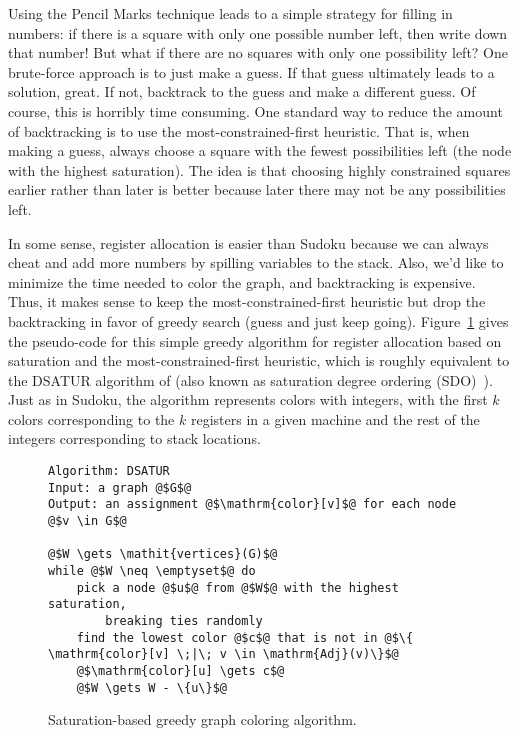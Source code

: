 \documentclass[12pt]{book}
\begin{document}
Using the Pencil Marks technique leads to a simple strategy for
filling in numbers: if there is a square with only one possible number
left, then write down that number! But what if there are no squares
with only one possibility left? One brute-force approach is to just
make a guess. If that guess ultimately leads to a solution, great.  If
not, backtrack to the guess and make a different guess.  Of course,
this is horribly time consuming. One standard way to reduce the amount
of backtracking is to use the most-constrained-first heuristic. That
is, when making a guess, always choose a square with the fewest
possibilities left (the node with the highest saturation).  The idea
is that choosing highly constrained squares earlier rather than later
is better because later there may not be any possibilities left.

In some sense, register allocation is easier than Sudoku because we
can always cheat and add more numbers by spilling variables to the
stack. Also, we'd like to minimize the time needed to color the graph,
and backtracking is expensive. Thus, it makes sense to keep the
most-constrained-first heuristic but drop the backtracking in favor of
greedy search (guess and just keep going).
Figure~\ref{fig:satur-algo} gives the pseudo-code for this simple
greedy algorithm for register allocation based on saturation and the
most-constrained-first heuristic, which is roughly equivalent to the
DSATUR algorithm of \cite{Brelaz:1979eu} (also known as
saturation degree ordering
(SDO)~\citep{Gebremedhin:1999fk,Omari:2006uq}).  Just as in Sudoku,
the algorithm represents colors with integers, with the first $k$
colors corresponding to the $k$ registers in a given machine and the
rest of the integers corresponding to stack locations.

\begin{figure}[btp]
  \centering
\begin{lstlisting}[basicstyle=\rmfamily,deletekeywords={for,from,with,is,not,in,find},morekeywords={while},columns=fullflexible]
Algorithm: DSATUR
Input: a graph @$G$@
Output: an assignment @$\mathrm{color}[v]$@ for each node @$v \in G$@

@$W \gets \mathit{vertices}(G)$@
while @$W \neq \emptyset$@ do
    pick a node @$u$@ from @$W$@ with the highest saturation,
        breaking ties randomly
    find the lowest color @$c$@ that is not in @$\{ \mathrm{color}[v] \;|\; v \in \mathrm{Adj}(v)\}$@
    @$\mathrm{color}[u] \gets c$@
    @$W \gets W - \{u\}$@
\end{lstlisting}
  \caption{Saturation-based greedy graph coloring algorithm.}
  \label{fig:satur-algo}
\end{figure}
\end{document}
